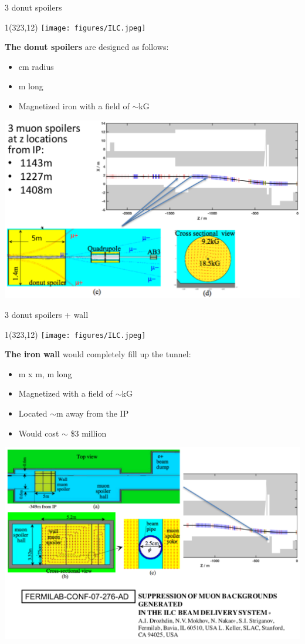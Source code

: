 \documentclass[xcolor={dvipsnames}]{beamer}
\newcommand{\ilclogo}{
  \setlength{\TPHorizModule}{1pt}
  \setlength{\TPVertModule}{1pt}
  \begin{textblock}{1}(323,12)
   \texttt{[image: figures/ILC.jpeg]}
  \end{textblock}
}
\begin{document}
\begin{frame}{3 donut spoilers}
\ilclogo
\textbf{The donut spoilers} are designed as follows:
\begin{itemize}
 \item \unit[70]{cm} radius
 \item \unit[5]{m} long
 \item Magnetized iron with a field of $\sim$\unit[10-19]{kG}
\end{itemize}
\begin{center}
\includegraphics[height=0.67\textheight]{Muon_spoilers.pdf}
\end{center}
\end{frame}

\begin{frame}{3 donut spoilers + wall}
\ilclogo
\textbf{The iron wall} would completely fill up the tunnel:
\begin{itemize}
 \item \unit[5]{m} x \unit[3]{m}, \unit[5]{m} long
 \item Magnetized with a field of $\sim$\unit[16]{kG}
 \item Located $\sim$\unit[400]{m} away from the IP
 \item Would cost $\sim$ \$3 million
\end{itemize}
\begin{center}
\includegraphics[height=0.7\textheight]{Muon_wall.pdf}
\end{center}
\end{frame}
\end{document}
